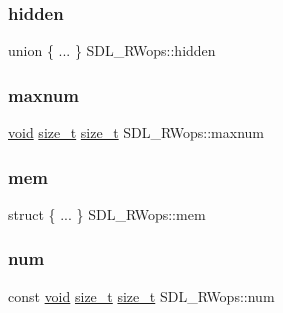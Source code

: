 \subsubsection{\texorpdfstring{hidden}{hidden}}
{\footnotesize\ttfamily union \{ ... \}   S\+D\+L\+\_\+\+R\+Wops\+::hidden}

\mbox{\label{struct_s_d_l___r_wops_a7786282ec28451085908f70048ee32c8}} 
\subsubsection{\texorpdfstring{maxnum}{maxnum}}
{\footnotesize\ttfamily \hyperlink{_s_d_l__opengles2__gl2ext_8h_ae5d8fa23ad07c48bb609509eae494c95}{void} \hyperlink{struct_s_d_l___r_wops_acd9a3c6e840d285c1e30cadaf99097b2}{size\+\_\+t} \hyperlink{struct_s_d_l___r_wops_acd9a3c6e840d285c1e30cadaf99097b2}{size\+\_\+t} S\+D\+L\+\_\+\+R\+Wops\+::maxnum}

\mbox{\label{struct_s_d_l___r_wops_a850037e0fc608e382caa9e4cdddefdee}} 
\subsubsection{\texorpdfstring{mem}{mem}}
{\footnotesize\ttfamily struct \{ ... \}   S\+D\+L\+\_\+\+R\+Wops\+::mem}

\mbox{\label{struct_s_d_l___r_wops_a630921d5c84cf48a4a10f9a75e1caa10}} 
\subsubsection{\texorpdfstring{num}{num}}
{\footnotesize\ttfamily const \hyperlink{_s_d_l__opengles2__gl2ext_8h_ae5d8fa23ad07c48bb609509eae494c95}{void} \hyperlink{struct_s_d_l___r_wops_acd9a3c6e840d285c1e30cadaf99097b2}{size\+\_\+t} \hyperlink{struct_s_d_l___r_wops_acd9a3c6e840d285c1e30cadaf99097b2}{size\+\_\+t} S\+D\+L\+\_\+\+R\+Wops\+::num}

\mbox{\label{struct_s_d_l___r_wops_ab1ee9d9e4f61b3b30f26160c282ae416}} 
